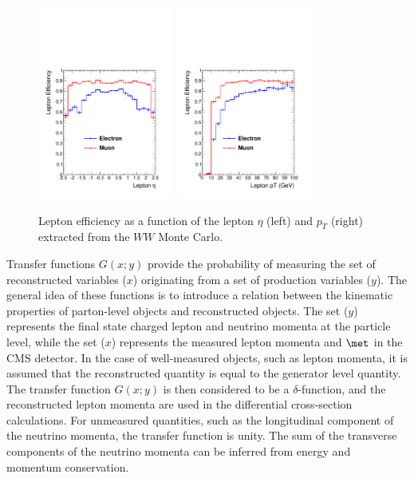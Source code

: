 \begin{figure}[!htbp]
\begin{center}
\includegraphics[width=0.4\textwidth]{figures/lepton_eff_Eta.pdf}
\includegraphics[width=0.4\textwidth]{figures/lepton_eff_Pt.pdf}\\
\caption{Lepton efficiency as a function of the lepton $\eta$ (left) and $p_{T}$ (right) extracted 
from the $WW$ Monte Carlo.}
\label{fig:lepeff_gen}
\end{center}
\end{figure}

Transfer functions $G(x;y)$ provide the probability of measuring the set of reconstructed variables ($x$) originating 
from a set of production variables ($y$). 
The general idea of these functions is to introduce a relation between the kinematic properties of parton-level objects
and reconstructed objects.
The set ($y$) represents the final state charged lepton and neutrino momenta at
the particle level, while the set ($x$) represents the measured lepton momenta and $\met$ in the CMS
detector. 
In the case of well-measured objects, such as lepton momenta, it is assumed that the reconstructed quantity is equal
to the generator level quantity.  The transfer function $G(x;y)$ is then considered to be a $\delta$-function, and the 
reconstructed lepton momenta are used in the differential cross-section calculations. For unmeasured quantities, such as
the longitudinal component of the neutrino momenta, the transfer function is unity. The sum of the transverse components
of the neutrino momenta can be inferred from energy and momentum conservation.

